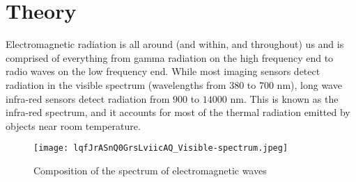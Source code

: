 \section{Theory}
\label{sec:theory}
Electromagnetic radiation is all around (and within, and throughout) us and is
comprised of everything from gamma radiation on the high frequency end to radio
waves on the low frequency end. While most imaging sensors detect radiation in
the visible spectrum (wavelengths from 380 to 700 \si{\nano\meter}), long wave
infra-red sensors detect radiation from $900$ to $14000$ \si{\nano\meter}. This
is known as the infra-red spectrum, and it accounts for most of the thermal
radiation emitted by objects near room temperature.
%
\begin{figure}[htb]
	\centering
	\texttt{[image: lqfJrASnQ0GrsLviicAQ\_Visible-spectrum.jpeg]}
	\caption{Composition of the spectrum of electromagnetic waves}
	\label{fig:spectrum}
\end{figure}